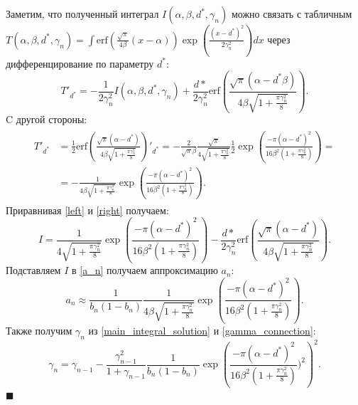 Заметим, что полученный интеграл $I(\alpha,\beta,d^*,\gamma_n)$ можно связать с табличным  
$T(\alpha,\beta,d^*,\gamma_n) = \int\text{erf}\left(\frac{\sqrt{\pi}}{4\beta} (x-\alpha) \right) \exp\left(\frac{(x-d^*)^2}{2 \gamma_n^2}\right) dx$ через дифференцирование по параметру $d^*$: 
\begin{equation}
    \label{left}
    T'_{d^*} = - \frac{1}{2\gamma_n^2}I(\alpha,\beta,d^*,\gamma_n) + \frac{d*}{2 \gamma_n^2} \text{erf}\left(\frac{\sqrt{\pi} (\alpha-d^* \beta )}{4 \beta \sqrt{1+\frac{\pi\gamma_n^2}{8}}} \right) .
\end{equation}
C другой стороны:
\begin{multline}
    \label{right}
    \begin{aligned}
        T'_{d^*} &= \frac{1}{2} \text{erf}\left(\frac{\sqrt{\pi} (\alpha-d^*)}{4  \beta \sqrt{1+\frac{\pi\gamma_n^2}{8}}} \right)'_{d^*} = - \frac{2}{\sqrt{\pi} \beta} \frac{\sqrt{\pi}}{4 \sqrt{1+\frac{\pi\gamma_n^2}{8}}}
        \frac{1}{2} \exp\left( \frac{- \pi (\alpha-d^*)^2}{16  \beta^2 ( 1+\frac{\pi\gamma_n^2}{8})}\right) =\\
        &= - \frac{1}{4  \beta \sqrt{1+\frac{\pi\gamma_n^2}{8}}}
        \exp\left( \frac{- \pi (\alpha-d^*)^2}{16  \beta^2( 1+\frac{\pi\gamma_n^2}{8})}\right).
    \end{aligned}
\end{multline}
Приравнивая \ref{left} и \ref{right} получаем:
\begin{equation}
    \label{main_integral_solution}
    I= \frac{1}{4 \sqrt{1+\frac{\pi\gamma_n^2}{8}}} \exp\left( \frac{- \pi (\alpha-d^*)^2}{16 \beta^2 ( 1+\frac{\pi\gamma_n^2}{8})}\right) - \frac{d*}{2 \gamma_n^2} \text{erf}\left(\frac{\sqrt{\pi} (\alpha-d^*)}{4 \beta\sqrt{1+\frac{\pi\gamma_n^2}{8}}} \right).   
\end{equation}
Подставляем $I$ в \ref{a_n} получаем аппроксимацию ${a_n}$:
\begin{equation}
     a_n \approx \frac{1}{b_n(1-b_n)} \frac{1}{4  \beta \sqrt{1+\frac{\pi\gamma_n^2}{8}}} \exp\left( \frac{- \pi (\alpha-d^*)^2}{16  \beta^2 ( 1+\frac{\pi\gamma_n^2}{8})}\right).
\end{equation}
Также получим $\gamma_n$ из \ref{main_integral_solution} и \ref{gamma_connection}: 
\begin{equation}
    \gamma_n = \gamma_{n-1} - \frac{\gamma_{n-1}^2}{1+\gamma_{n-1}} \frac{1}{b_n(1-b_n)}
    \exp\left(\frac{- \pi (\alpha-d^*)^2}{16  \beta^2 ( 1+\frac{\pi\gamma_n^2}{8})})^2\right)^2.
\end{equation}
$\blacksquare$


